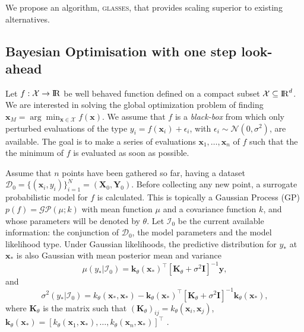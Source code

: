 \documentclass[twoside]{article}
\def\bbbr{{\rm I\!R}}
\newcommand{\I}{\mathcal{I}}
\newcommand{\bx}{\textbf{x}}
\newcommand{\bX}{\textbf{X}}
\newcommand{\bY}{\textbf{Y}}
\newcommand{\by}{\textbf{y}}
\newcommand{\bk}{\textbf{k}}
\newcommand{\bK}{\textbf{K}}
\newcommand{\data}{\mathcal{D}}
\newcommand{\acr}[1]{\textsc{#1}\xspace}
\newcommand{\us}{\acr{glasses}}
\begin{document}
We propose an algorithm, \us, that provides scaling superior to existing alternatives.

\subsection{Bayesian Optimisation with one step look-ahead} %

\label{sec:bayesian_optimisation}


Let $f: {\mathcal X} \to \bbbr$ be well behaved function defined on a compact subset ${\mathcal X} \subseteq \bbbr^d$. We are interested in solving the global optimization problem of finding $\bx_{M} = \arg \min_{\bx \in {\mathcal X}} f(\bx)$. We assume that $f$ is a \emph{black-box} from which only perturbed evaluations of the type $y_i = f(\bx_i) + \epsilon_i$, with $\epsilon_i \sim\mathcal{N}(0,\sigma^2)$, are  available. The goal is to make a series of  evaluations $\bx_1,\dots,\bx_n$ of $f$ such that the the minimum of $f$ is evaluated as soon as possible.

Assume that $n$ points have been gathered so far, having a dataset $\data_0 = \{(\bx_i,y_i)\}_{i=1}^N = (\bX_0,\bY_0)$. Before collecting any new point, a surrogate probabilistic model for $f$ is calculated. This is topically a Gaussian Process (GP) $p(f) = \mathcal{GP}(\mu; k)$ with mean function $\mu$ and a covariance function $k$, and whose parameters will be denoted by $\theta$.  Let $\I_0$ be the current available information: the conjunction of $\data_0$, the model parameters and the model likelihood type.  Under Gaussian likelihoods, the predictive distribution for $y_*$ at $\bx_*$ is also Gaussian with mean posterior mean and variance
$$\mu(y_{*}|\I_0) = \bk_{\theta}(\bx_*)^\top[\bK_{\theta} + \sigma^2 \textbf{I}]^{-1}\by,$$
and
$$\sigma^2(y_*|\I_0)=k_{\theta}(\bx_*,\bx_*)-\bk_{\theta}(\bx_*)^\top[\bK_{\theta}+\sigma^2 \textbf{I}]^{-1}\bk_{\theta}(\bx_*),$$
where $\bK_{\theta}$ is the matrix such that $(\bK_{\theta})_{ij}=k_{\theta}(\bx_i,\bx_j)$,  $\bk_{\theta}(\bx_{*}) = [k_{\theta}(\bx_1,\bx_{*}),\dots,k_{\theta}(\bx_n,\bx_{*})]^\top$ \cite{Rasmussen:2005:GPM:1162254}.  
\end{document}
